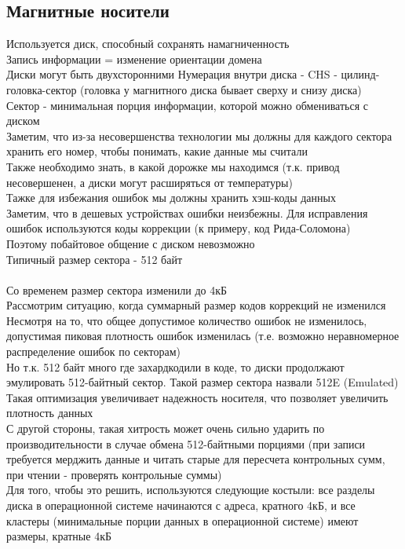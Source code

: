 \documentclass[12pt]{article}
\begin{document}
\subsection{Магнитные носители}
Используется диск, способный сохранять намагниченность\\
Запись информации = изменение ориентации домена\\
Диски могут быть двухсторонними
Нумерация внутри диска - CHS - цилинд-головка-сектор (головка у магнитного диска бывает сверху и снизу диска)\\
Сектор - минимальная порция информации, которой можно обмениваться с диском\\
Заметим, что из-за несовершенства технологии мы должны для каждого сектора хранить его номер, чтобы понимать, какие данные мы считали\\
Также необходимо знать, в какой дорожке мы находимся (т.к. привод несовершенен, а диски могут расширяться от температуры)\\
Тажке для избежания ошибок мы должны хранить хэш-коды данных\\
Заметим, что в дешевых устройствах ошибки неизбежны. Для исправления ошибок используются коды коррекции (к примеру, код Рида-Соломона)\\
Поэтому побайтовое общение с диском невозможно\\
Типичный размер сектора - 512 байт\\\\
Со временем размер сектора изменили до 4кБ\\
Рассмотрим ситуацию, когда суммарный размер кодов коррекций не изменился\\
Несмотря на то, что общее допустимое количество ошибок не изменилось, допустимая пиковая плотность ошибок изменилась (т.е. возможно неравномерное распределение ошибок по секторам)\\
Но т.к. 512 байт много где захардкодили в коде, то диски продолжают эмулировать 512-байтный сектор. Такой размер сектора назвали 512E (Emulated)\\
Такая оптимизация увеличивает надежность носителя, что позволяет увеличить плотность данных\\
С другой стороны, такая хитрость может очень сильно ударить по производительности в случае обмена 512-байтными порциями (при записи требуется мерджить данные и читать старые для пересчета контрольных сумм, при чтении - проверять контрольные суммы)\\
Для того, чтобы это решить, используются следующие костыли: все разделы диска в операционной системе начинаются с адреса, кратного 4кБ, и все кластеры (минимальные порции данных в операционной системе) имеют размеры, кратные 4кБ\\\\
\end{document}
